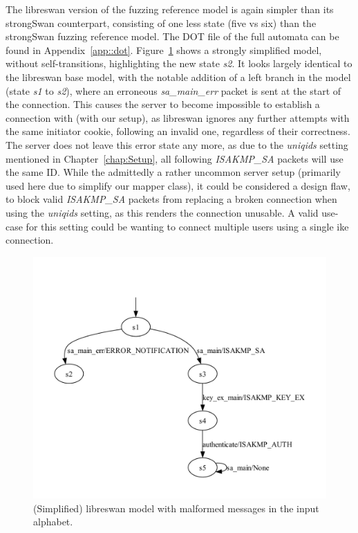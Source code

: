 The libreswan version of the fuzzing reference model is again simpler than its strongSwan counterpart, consisting of one less state (five vs six) than the strongSwan fuzzing reference model. The DOT file of the full automata can be found in Appendix~\ref{app::dot}. Figure~\ref{fig:learnedmodellibrereference} shows a strongly simplified model, without self-transitions, highlighting the new state \emph{s2}. It looks largely identical to the libreswan base model, with the notable addition of a left branch in the model (state \emph{s1} to \emph{s2}), where an erroneous \emph{sa\_main\_err} packet is sent at the start of the connection. This causes the server to become impossible to establish a connection with (with our setup), as libreswan ignores any further attempts with the same initiator cookie, following an invalid one, regardless of their correctness. The server does not leave this error state any more, as due to the \emph{uniqids} setting mentioned in Chapter~\ref{chap:Setup}, all following \emph{ISAKMP\_SA} packets will use the same ID. While the admittedly a rather uncommon server setup (primarily used here due to simplify our mapper class), it could be considered a design flaw, to block valid \emph{ISAKMP\_SA} packets from replacing a broken connection when using the \emph{uniqids} setting, as this renders the connection unusable. A valid use-case for this setting could be wanting to connect multiple users using a single \ac{ike} connection.

\begin{figure}[H]
	\centering
	\includegraphics[width=0.7\linewidth]{images/models/LearnedModelLibreReference}
	\caption{(Simplified) libreswan model with malformed messages in the input alphabet.}
	\label{fig:learnedmodellibrereference}
\end{figure}

